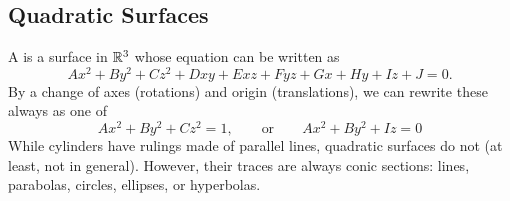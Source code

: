 \subsection{Quadratic Surfaces}

A  is a surface in \(\mathbb{R}^{3}\) whose equation can be written as
\[
    Ax^{2} + By^{2} + Cz^{2} + Dxy + Exz + Fyz + Gx + Hy + Iz + J = 0.
\]
By a change of axes (rotations) and origin (translations), we can rewrite these always as one of 
\[
    Ax^{2} + By^{2} + Cz^{2} = 1, \qquad \text{or} \qquad Ax^{2} + By^{2} + Iz = 0
\]
While cylinders have rulings made of parallel lines, quadratic surfaces do not (at least, not in general).
However, their traces are always conic sections: lines, parabolas, circles, ellipses, or hyperbolas.
